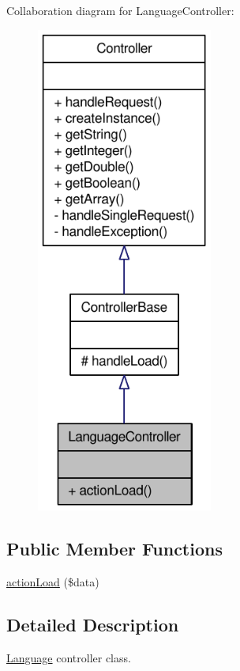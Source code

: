 Collaboration diagram for LanguageController:\nopagebreak
\begin{figure}[H]
\begin{center}
\leavevmode
\includegraphics[width=164pt]{classLanguageController__coll__graph}
\end{center}
\end{figure}
\subsection*{Public Member Functions}
\begin{DoxyCompactItemize}
\item 
\hyperlink{classLanguageController_aa4d532a350cf860a85974c63ec36e903}{actionLoad} (\$data)
\end{DoxyCompactItemize}


\subsection{Detailed Description}
\hyperlink{classLanguage}{Language} controller class. 

